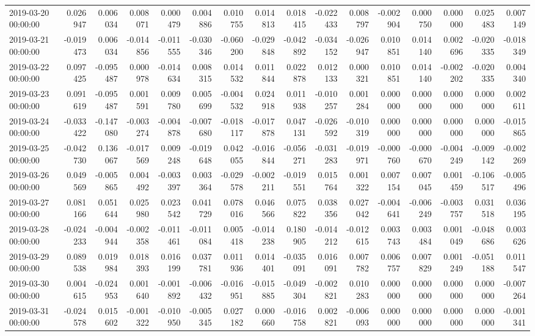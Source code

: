 \begin{tabular}{lrrrrrrrrrrrrrrr}
2019-03-20 00:00:00 & 0.026947 & 0.006034 & 0.008071 & 0.000479 & 0.004886 & 0.010755 & 0.014813 & 0.018415 & -0.022433 & 0.008797 & -0.002904 & 0.000750 & 0.000000 & 0.025483 & 0.007149 \\
2019-03-21 00:00:00 & -0.019473 & 0.006034 & -0.014856 & -0.011555 & -0.030346 & -0.060200 & -0.029848 & -0.042892 & -0.034152 & -0.026947 & 0.010851 & 0.014140 & 0.002696 & -0.020335 & -0.018349 \\
2019-03-22 00:00:00 & 0.097425 & -0.095487 & 0.000978 & -0.014634 & 0.008315 & 0.014532 & 0.011844 & 0.022878 & 0.012133 & 0.000321 & 0.010851 & 0.014140 & -0.002202 & -0.020335 & 0.004340 \\
2019-03-23 00:00:00 & 0.091619 & -0.095487 & 0.001591 & 0.009780 & 0.005699 & -0.004532 & 0.024918 & 0.011938 & -0.010257 & 0.001284 & 0.000000 & 0.000000 & 0.000000 & 0.000000 & 0.002611 \\
2019-03-24 00:00:00 & -0.033422 & -0.147080 & -0.003274 & -0.004878 & -0.007680 & -0.018117 & -0.017878 & 0.047131 & -0.026592 & -0.010319 & 0.000000 & 0.000000 & 0.000000 & 0.000000 & -0.015865 \\
2019-03-25 00:00:00 & -0.042730 & 0.136067 & -0.017569 & 0.009248 & -0.019648 & 0.042055 & -0.016844 & -0.056271 & -0.031283 & -0.019971 & -0.000760 & -0.000670 & -0.004249 & -0.009142 & -0.002269 \\
2019-03-26 00:00:00 & 0.049569 & -0.005865 & 0.004492 & -0.003397 & 0.003364 & -0.029578 & -0.002211 & -0.019551 & 0.015764 & 0.001322 & 0.007154 & 0.007045 & 0.001459 & -0.106517 & -0.005496 \\
2019-03-27 00:00:00 & 0.081166 & 0.051644 & 0.025980 & 0.023542 & 0.041729 & 0.078016 & 0.046566 & 0.075822 & 0.038356 & 0.027042 & -0.004641 & -0.006249 & -0.003757 & 0.031518 & 0.036195 \\
2019-03-28 00:00:00 & -0.024233 & -0.004944 & -0.002358 & -0.011461 & -0.011084 & 0.005418 & -0.014238 & 0.180905 & -0.014212 & -0.012615 & 0.003743 & 0.003484 & 0.001049 & -0.048686 & 0.003626 \\
2019-03-29 00:00:00 & 0.089538 & 0.019984 & 0.018393 & 0.016199 & 0.037781 & 0.011936 & 0.014401 & -0.035091 & 0.016091 & 0.007782 & 0.006757 & 0.007829 & 0.001249 & -0.051188 & 0.011547 \\
2019-03-30 00:00:00 & 0.004615 & -0.024953 & 0.001640 & -0.001892 & -0.006432 & -0.016951 & -0.015885 & -0.049304 & -0.002821 & 0.010283 & 0.000000 & 0.000000 & 0.000000 & 0.000000 & -0.007264 \\
2019-03-31 00:00:00 & -0.024578 & 0.015602 & -0.001322 & -0.010950 & -0.005345 & 0.027182 & 0.000660 & -0.016758 & 0.002821 & -0.006093 & 0.000000 & 0.000000 & 0.000000 & 0.000000 & -0.001341 \\

\end{tabular}
